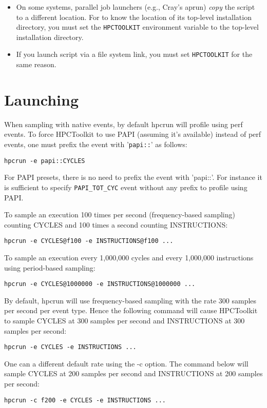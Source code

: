 \documentclass[english]{article}
\begin{document}
\begin{itemize}
\item On some systems, parallel job launchers (e.g., Cray's aprun) \emph{copy} the
        script to a different location. For  to know
       the location of its top-level installation directory, 
       you must set the \verb+HPCTOOLKIT+ environment variable to the 
       top-level installation directory.
\item 
       If you launch  script via a file system link,
       you must set \verb+HPCTOOLKIT+ for the same reason.
\end{itemize}


\section{Launching}

When sampling with native events, by default hpcrun will profile using perf events.
To force HPCToolkit to use PAPI (assuming it's available) instead of perf events, one
must prefix the event with '\texttt{papi::}' as follows:

\begin{verbatim}
hpcrun -e papi::CYCLES
\end{verbatim}

For PAPI presets, there is no need to prefix the event with 'papi::'. For instance it is
sufficient to specify \texttt{PAPI\_TOT\_CYC} event without any prefix to profile using PAPI.

To sample an execution 100 times per second (frequency-based sampling) counting
CYCLES and 100 times a second counting INSTRUCTIONS:
\begin{verbatim}
hpcrun -e CYCLES@f100 -e INSTRUCTIONS@f100 ...
\end{verbatim}

To sample an execution every 1,000,000 cycles and every 1,000,000 instructions using
period-based sampling:
\begin{verbatim}
hpcrun -e CYCLES@1000000 -e INSTRUCTIONS@1000000 ...
\end{verbatim}
By default, hpcrun will use frequency-based sampling with the rate 300 samples per
second per event type. Hence the following command will cause HPCToolkit to sample
CYCLES at 300 samples per second and INSTRUCTIONS at 300 samples per second:
\begin{verbatim}
hpcrun -e CYCLES -e INSTRUCTIONS ...
\end{verbatim}
One can a different default rate using the -c option. The command below will sample
CYCLES at 200 samples per second and INSTRUCTIONS at 200 samples per second:
\begin{verbatim}
hpcrun -c f200 -e CYCLES -e INSTRUCTIONS ...
\end{verbatim}
\end{document}
